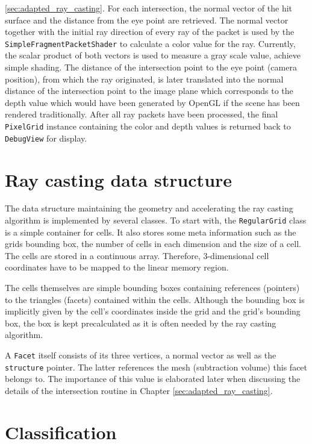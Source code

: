 \ref{sec:adapted_ray_casting}. For each intersection, the normal vector of the hit surface and the distance from the eye point are retrieved. The normal vector together with the initial ray direction of every ray of the packet is used by the \lstinline!SimpleFragmentPacketShader! to calculate a color value for the ray. Currently, the scalar product of both vectors is used to measure a gray scale value, achieve simple shading. The distance of the intersection point to the eye point (camera position), from which the ray originated, is later translated into the normal distance of the intersection point to the image plane which corresponds to the depth value which would have been generated by OpenGL if the scene has been rendered traditionally. After all ray packets have been processed, the final \lstinline!PixelGrid! instance containing the color and depth values is returned back to \lstinline!DebugView! for display.

\section{Ray casting data structure}
\label{sec:data_structure}

The data structure maintaining the geometry and accelerating the ray casting algorithm is implemented by several classes. To start with, the \lstinline!RegularGrid! class is a simple container for cells. It also stores some meta information such as the grids bounding box, the number of cells in each dimension and the size of a cell. The cells are stored in a continuous array. Therefore, 3-dimensional cell coordinates have to be mapped to the linear memory region.

The cells themselves are simple bounding boxes containing references (pointers) to the triangles (facets) contained within the cells. Although the bounding box is implicitly given by the cell's coordinates inside the grid and the grid's bounding box, the box is kept precalculated as it is often needed by the ray casting algorithm. 

A \lstinline!Facet! itself consists of its three vertices, a normal vector as well as the \lstinline!structure! pointer. The latter references the mesh (subtraction volume) this facet belongs to. The importance of this value is elaborated later when discussing the details of the intersection routine in Chapter \ref{sec:adapted_ray_casting}.

\section{Classification}
\label{sec:classification}

